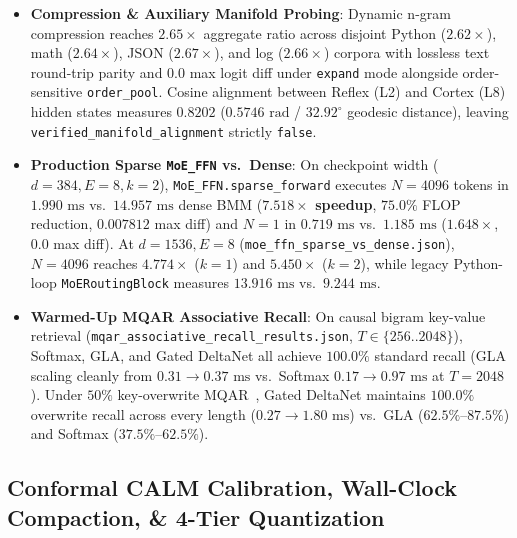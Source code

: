 \documentclass[10pt,twocolumn,letterpaper]{article}
\begin{document}
\begin{itemize}
    \item \textbf{Compression \& Auxiliary Manifold Probing}: Dynamic n-gram compression reaches $2.65\times$ aggregate ratio across disjoint Python ($2.62\times$), math ($2.64\times$), JSON ($2.67\times$), and log ($2.66\times$) corpora with lossless text round-trip parity and $0.0$ max logit diff under \texttt{expand} mode alongside order-sensitive \texttt{order\_pool}. Cosine alignment between Reflex (L2) and Cortex (L8) hidden states measures $0.8202$ ($0.5746\text{ rad}$ / $32.92^\circ$ geodesic distance), leaving \texttt{verified\_manifold\_alignment} strictly \texttt{false}.
    \item \textbf{Production Sparse \texttt{MoE\_FFN} vs.\ Dense}: On checkpoint width ($d=384, E=8, k=2$), \texttt{MoE\_FFN.sparse\_forward} executes $N=4096$ tokens in $1.990\text{ ms}$ vs.\ $14.957\text{ ms}$ dense BMM (\textbf{$7.518\times$ speedup}, $75.0\%$ FLOP reduction, $0.007812$ max diff) and $N=1$ in $0.719\text{ ms}$ vs.\ $1.185\text{ ms}$ ($1.648\times$, $0.0$ max diff). At $d=1536, E=8$ (\texttt{moe\_ffn\_sparse\_vs\_dense.json}), $N=4096$ reaches \textbf{$4.774\times$} ($k=1$) and \textbf{$5.450\times$} ($k=2$), while legacy Python-loop \texttt{MoERoutingBlock} measures $13.916\text{ ms}$ vs.\ $9.244\text{ ms}$.
    \item \textbf{Warmed-Up MQAR Associative Recall}: On causal bigram key-value retrieval (\texttt{mqar\_associative\_recall\_results.json}, $T \in \{256..2048\}$), Softmax, GLA, and Gated DeltaNet all achieve $100.0\%$ standard recall (GLA scaling cleanly from $0.31 \to 0.37\text{ ms}$ vs.\ Softmax $0.17 \to 0.97\text{ ms}$ at $T=2048$). Under $50\%$ key-overwrite MQAR~\cite{arora2024zoology}, Gated DeltaNet maintains \textbf{$100.0\%$} overwrite recall across every length ($0.27 \to 1.80\text{ ms}$) vs.\ GLA ($62.5\%$--$87.5\%$) and Softmax ($37.5\%$--$62.5\%$).
\end{itemize}

\subsection{Conformal CALM Calibration, Wall-Clock Compaction, \& 4-Tier Quantization}
\end{document}
